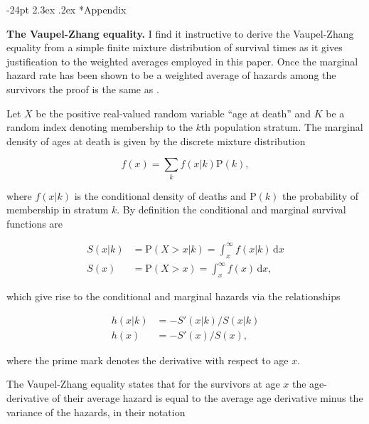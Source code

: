 \documentclass[10pt,twoside,reqno]{article}
\makeatletter
\renewcommand\section{\@startsection {section}{1}{\z@}%
                                   {-24pt}%
                                   {2.3ex \@plus.2ex}%
                                   {\normalfont\large\bfseries}}
\makeatother
\begin{document}
  \clearpage
  \section*{Appendix \currentappendixlabel}\FloatBarrier
  \setcounter{section}{0}
  \renewcommand{\thesection}{\currentappendixfloatlabel-\arabic{section}}
  \setcounter{figure}{0}
  \renewcommand{\thefigure}{\currentappendixfloatlabel-\arabic{figure}}
  \setcounter{table}{0}
  \renewcommand{\thetable}{\currentappendixfloatlabel-\arabic{table}}

  \textbf{The Vaupel-Zhang equality.}
  I find it instructive to derive the Vaupel-Zhang equality from a simple finite mixture distribution of survival times as it gives justification to the weighted averages employed in this paper. Once the marginal hazard rate has been shown to be a weighted average of hazards among the survivors the proof is the same as \citet{Vaupel2010a}.

  Let \(X\) be the positive real-valued random variable ``age at death'' and \(K\) be a random index denoting membership to the \(k\)th population stratum. The marginal density of ages at death is given by the discrete mixture distribution

  \[
  f(x)=\sum_k f(x|k)\mathrm{P}(k),
  \]

  where \(f(x|k)\) is the conditional density of deaths and \(\mathrm{P}(k)\) the probability of membership in stratum \(k\). By definition the conditional and marginal survival functions are

  \[
  \begin{aligned}
  S(x|k) &= \mathrm{P}(X>x|k) = \int_x^\infty f(x|k)\,\text{d}x \\
  S(x) &= \mathrm{P}(X>x) = \int_x^\infty f(x)\,\text{d}x,
  \end{aligned}
  \]

  which give rise to the conditional and marginal hazards via the relationships

  \[
  \begin{aligned}
  h(x|k) &= -S'(x|k)/S(x|k)\\
  h(x) &= -S'(x)/S(x),
  \end{aligned}
  \]

  where the prime mark denotes the derivative with respect to age \(x\).

  The Vaupel-Zhang equality states that for the survivors at age \(x\) the age-derivative of their average hazard is equal to the average age derivative minus the variance of the hazards, in their notation
\end{document}
